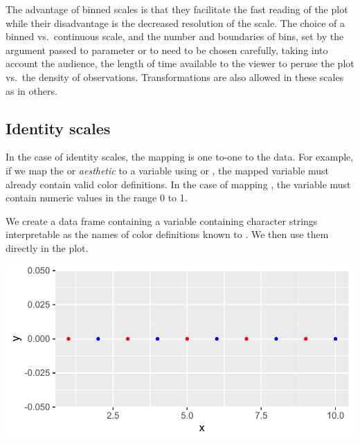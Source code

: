 \documentclass[krantz2]{krantz}\usepackage{knitr}
\begin{document}
The advantage of binned scales is that they facilitate the fast reading of the plot while their disadvantage is the decreased resolution of the scale. The choice of a binned vs.\ continuous scale, and the number and boundaries of bins, set by the argument passed to parameter  or to  need to be chosen carefully, taking into account the audience, the length of time available to the viewer to peruse the plot vs.\ the density of observations. Transformations are also allowed in these scales as in others.


\subsection{Identity scales}
In the case of identity scales, the mapping is one to-one to the data. For example, if we map the  or  \emph{aesthetic} to a variable using  or , the mapped variable must already contain valid color definitions. In the case of mapping , the variable must contain numeric values in the range 0 to 1.

We create a data frame containing a variable  containing character strings interpretable as the names of color definitions known to \Rlang. We then use them directly in the plot.

\begin{knitrout}\footnotesize
{}\color{fgcolor}\begin{kframe}
\begin{alltt}
 \hlkwb{<-} \hlstd{(} \hlstd{=} \hlopt{:}\hlstd{,}  \hlstd{=} \hlstd{(}\hlstd{),}  \hlstd{=} \hlstd{(}\hlstd{(}\hlstd{,} \hlstd{),} \hlstd{))}

    \hlopt{+}
  \hlstd{()} \hlopt{+}
  \hlstd{()}
\end{alltt}
\end{kframe}

{\centering \includegraphics[width=.7\textwidth]{figure/pos-scale-color-10-1} 

}


\end{knitrout}
\end{document}
